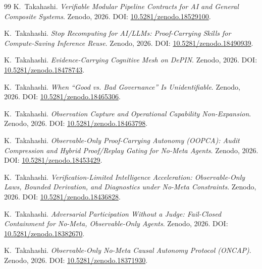 \documentclass[11pt,a4paper]{article}
\theoremstyle{definition}
\theoremstyle{remark}
\begin{document}
\begin{thebibliography}{99}
K.~Takahashi.
\newblock \emph{Verifiable Modular Pipeline Contracts for AI and General Composite Systems}.
\newblock Zenodo, 2026.
\newblock DOI: \href{https://doi.org/10.5281/zenodo.18529100}{10.5281/zenodo.18529100}.

K.~Takahashi.
\newblock \emph{Stop Recomputing for AI/LLMs: Proof-Carrying Skills for Compute-Saving Inference Reuse}.
\newblock Zenodo, 2026.
\newblock DOI: \href{https://doi.org/10.5281/zenodo.18490939}{10.5281/zenodo.18490939}.

K.~Takahashi.
\newblock \emph{Evidence-Carrying Cognitive Mesh on DePIN}.
\newblock Zenodo, 2026.
\newblock DOI: \href{https://doi.org/10.5281/zenodo.18478743}{10.5281/zenodo.18478743}.

K.~Takahashi.
\newblock \emph{When ``Good vs. Bad Governance'' Is Unidentifiable}.
\newblock Zenodo, 2026.
\newblock DOI: \href{https://doi.org/10.5281/zenodo.18465306}{10.5281/zenodo.18465306}.

K.~Takahashi.
\newblock \emph{Observation Capture and Operational Capability Non-Expansion}.
\newblock Zenodo, 2026.
\newblock DOI: \href{https://doi.org/10.5281/zenodo.18463798}{10.5281/zenodo.18463798}.

K.~Takahashi.
\newblock \emph{Observable-Only Proof-Carrying Autonomy (OOPCA): Audit Compression and Hybrid Proof/Replay Gating for No-Meta Agents}.
\newblock Zenodo, 2026.
\newblock DOI: \href{https://doi.org/10.5281/zenodo.18453429}{10.5281/zenodo.18453429}.

K.~Takahashi.
\newblock \emph{Verification-Limited Intelligence Acceleration: Observable-Only Laws, Bounded Derivation, and Diagnostics under No-Meta Constraints}.
\newblock Zenodo, 2026.
\newblock DOI: \href{https://doi.org/10.5281/zenodo.18436828}{10.5281/zenodo.18436828}.

K.~Takahashi.
\newblock \emph{Adversarial Participation Without a Judge: Fail-Closed Containment for No-Meta, Observable-Only Agents}.
\newblock Zenodo, 2026.
\newblock DOI: \href{https://doi.org/10.5281/zenodo.18382670}{10.5281/zenodo.18382670}.

K.~Takahashi.
\newblock \emph{Observable-Only No-Meta Causal Autonomy Protocol (ONCAP)}.
\newblock Zenodo, 2026.
\newblock DOI: \href{https://doi.org/10.5281/zenodo.18371930}{10.5281/zenodo.18371930}.


\end{thebibliography}
\end{document}
